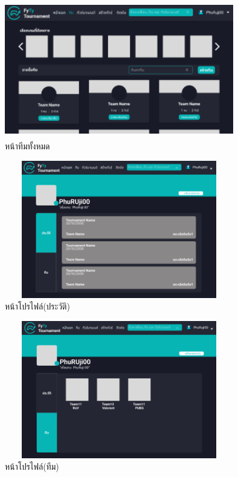 \begin{figure}[h]
  \begin{center}
  \includegraphics[width=10cm,height=6cm,keepaspectratio]{allteam.png}
  \end{center}
  \caption[หน้าทีมทั้งหมด]{หน้าทีมทั้งหมด}
  \label{fig:หน้าทีมทั้งหมด}
\end{figure}

\begin{figure}[h]
  \begin{center}
  \includegraphics[width=10cm,height=6cm,keepaspectratio]{profileHis.png}
  \end{center}
  \caption[หน้าโปรไฟล์(ประวัติ)]{หน้าโปรไฟล์(ประวัติ)}
  \label{fig:หน้าโปรไฟล์(ประวัติ)}
\end{figure}

\begin{figure}[h]
  \begin{center}
  \includegraphics[width=10cm,height=6cm,keepaspectratio]{profileTeam.png}
  \end{center}
  \caption[หน้าโปรไฟล์(ทีม)]{หน้าโปรไฟล์(ทีม)}
  \label{fig:หน้าโปรไฟล์(ทีม)}
\end{figure}

